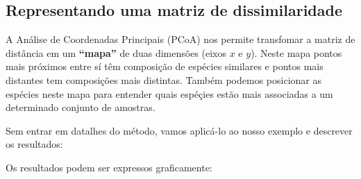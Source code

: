 \documentclass[
]{book}
\newenvironment{Shaded}{\begin{snugshade}}{\end{snugshade}}
\newcommand{\AttributeTok}[1]{\textcolor[rgb]{0.77,0.63,0.00}{#1}}
\newcommand{\CommentTok}[1]{\textcolor[rgb]{0.56,0.35,0.01}{\textit{#1}}}
\newcommand{\ConstantTok}[1]{\textcolor[rgb]{0.00,0.00,0.00}{#1}}
\newcommand{\DecValTok}[1]{\textcolor[rgb]{0.00,0.00,0.81}{#1}}
\newcommand{\FunctionTok}[1]{\textcolor[rgb]{0.00,0.00,0.00}{#1}}
\newcommand{\NormalTok}[1]{#1}
\newcommand{\OtherTok}[1]{\textcolor[rgb]{0.56,0.35,0.01}{#1}}
\newcommand{\SpecialCharTok}[1]{\textcolor[rgb]{0.00,0.00,0.00}{#1}}
\newcommand{\StringTok}[1]{\textcolor[rgb]{0.31,0.60,0.02}{#1}}
\begin{document}
\hypertarget{representando-uma-matriz-de-dissimilaridade}{%
\subsection{Representando uma matriz de dissimilaridade}\label{representando-uma-matriz-de-dissimilaridade}}

A Análise de Coordenadas Principais (PCoA) nos permite transfomar a matriz de distância em um \textbf{``mapa''} de duas dimensões (eixos \(x\) e \(y\)). Neste mapa pontos mais próximos entre sí têm composição de espécies similares e pontos mais distantes tem composições mais distintas. Também podemos posicionar as espécies neste mapa para entender quais espéçies estão mais associadas a um determinado conjunto de amostras.

Sem entrar em datalhes do método, vamos aplicá-lo ao nosso exemplo e descrever os resultados:

\begin{Shaded}
\end{Shaded}

Os resultados podem ser expressos graficamente:
\end{document}
